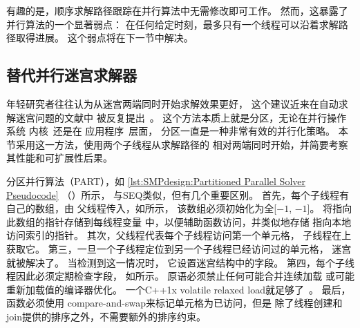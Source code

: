 有趣的是，顺序求解路径跟踪在并行算法中无需修改即可工作。
然而，这暴露了并行算法的一个显著弱点：
在任何给定时刻，最多只有一个线程可以沿着求解路径取得进展。
这个弱点将在下一节中解决。

\subsection{替代并行迷宫求解器}
\label{sec:SMPdesign:Alternative Parallel Maze Solver}

年轻研究者往往认为从迷宫两端同时开始求解效果更好，
这个建议近来在自动求解迷宫问题的文献中
被反复提出~\cite{UMD:CMSC433maze}。
这个方法本质上就是分区，无论在并行操作系统
内核~\cite{Beck85,Inman85}还是在
应用程序~\cite{DavidAPatterson2010TroubleMulticore}层面，
分区一直是一种非常有效的并行化策略。
本节采用这一方法，使用两个子线程从求解路径的
相对两端同时开始，并简要考察其性能和可扩展性后果。

\begin{listing}
\begin{fcvlabel}
\end{fcvlabel}
\caption{分区并行求解器伪代码}
\label{lst:SMPdesign:Partitioned Parallel Solver Pseudocode}
\end{listing}

\begin{fcvref}
分区并行算法（PART），如
\cref{lst:SMPdesign:Partitioned Parallel Solver Pseudocode}
（）所示，
与SEQ类似，但有几个重要区别。
首先，每个子线程有自己的数组，由
父线程传入，如所示，
该数组必须初始化为全[$-1$, $-1$]。
将指向此数组的指针存储到每线程变量
中，以便辅助函数访问，并类似地存储
指向本地访问索引的指针。
其次，父线程代表每个子线程访问第一个单元格，
子线程在上获取它。
第三，一旦一个子线程定位到另一个子线程已经访问过的单元格，
迷宫就被解决了。
当检测到这一情况时，
它设置迷宫结构中的字段。
第四，每个子线程因此必须定期检查字段，
如所示。
原语必须禁止任何可能合并连续加载
或可能重新加载值的编译器优化。
一个C++1x volatile relaxed load就足够了~\cite{RichardSmith2019N4800}。
最后，函数必须使用
compare-and-swap来标记单元格为已访问，但是
除了线程创建和join提供的排序之外，不需要额外的排序约束。
\end{fcvref}

